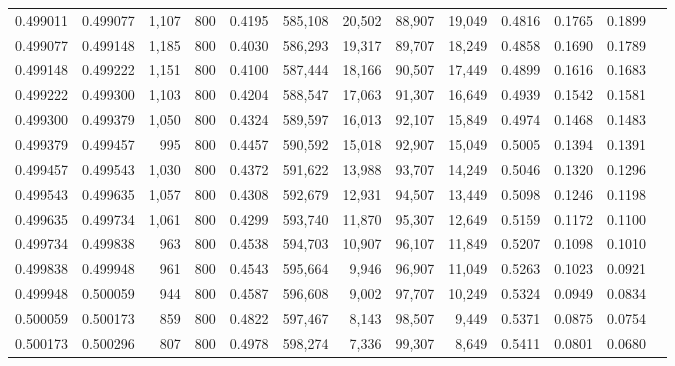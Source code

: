\begin{tabular}{rrrrrrrrrrrrr}
0.499011 & 0.499077 &  1,107 &   800 &                                     0.4195 & 585,108 &  20,502 &  88,907 &  19,049 & 0.4816 & 0.1765 & 0.1899 \\
0.499077 & 0.499148 &  1,185 &   800 &                                     0.4030 & 586,293 &  19,317 &  89,707 &  18,249 & 0.4858 & 0.1690 & 0.1789 \\
0.499148 & 0.499222 &  1,151 &   800 &                                     0.4100 & 587,444 &  18,166 &  90,507 &  17,449 & 0.4899 & 0.1616 & 0.1683 \\
0.499222 & 0.499300 &  1,103 &   800 &                                     0.4204 & 588,547 &  17,063 &  91,307 &  16,649 & 0.4939 & 0.1542 & 0.1581 \\
0.499300 & 0.499379 &  1,050 &   800 &                                     0.4324 & 589,597 &  16,013 &  92,107 &  15,849 & 0.4974 & 0.1468 & 0.1483 \\
0.499379 & 0.499457 &    995 &   800 &                                     0.4457 & 590,592 &  15,018 &  92,907 &  15,049 & 0.5005 & 0.1394 & 0.1391 \\
0.499457 & 0.499543 &  1,030 &   800 &                                     0.4372 & 591,622 &  13,988 &  93,707 &  14,249 & 0.5046 & 0.1320 & 0.1296 \\
0.499543 & 0.499635 &  1,057 &   800 &                                     0.4308 & 592,679 &  12,931 &  94,507 &  13,449 & 0.5098 & 0.1246 & 0.1198 \\
0.499635 & 0.499734 &  1,061 &   800 &                                     0.4299 & 593,740 &  11,870 &  95,307 &  12,649 & 0.5159 & 0.1172 & 0.1100 \\
0.499734 & 0.499838 &    963 &   800 &                                     0.4538 & 594,703 &  10,907 &  96,107 &  11,849 & 0.5207 & 0.1098 & 0.1010 \\
0.499838 & 0.499948 &    961 &   800 &                                     0.4543 & 595,664 &   9,946 &  96,907 &  11,049 & 0.5263 & 0.1023 & 0.0921 \\
0.499948 & 0.500059 &    944 &   800 &                                     0.4587 & 596,608 &   9,002 &  97,707 &  10,249 & 0.5324 & 0.0949 & 0.0834 \\
0.500059 & 0.500173 &    859 &   800 &                                     0.4822 & 597,467 &   8,143 &  98,507 &   9,449 & 0.5371 & 0.0875 & 0.0754 \\
0.500173 & 0.500296 &    807 &   800 &                                     0.4978 & 598,274 &   7,336 &  99,307 &   8,649 & 0.5411 & 0.0801 & 0.0680 \\

\end{tabular}
